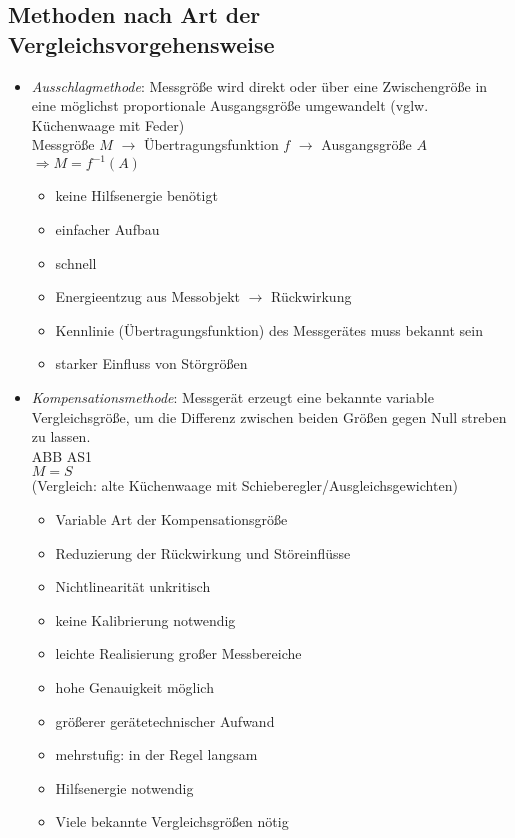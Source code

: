 \subsection{Methoden nach Art der Vergleichsvorgehensweise}
\begin{itemize}
\item \emph{Ausschlagmethode}: Messgröße wird direkt oder über eine Zwischengröße in eine möglichst proportionale Ausgangsgröße umgewandelt (vglw. Küchenwaage mit Feder)\\
Messgröße $M$ $\to$ Übertragungsfunktion $f$ $\to$ Ausgangsgröße $A$\\
$\Rightarrow \boxed{M = f^{-1}(A)}$
\begin{itemize}[label=$+$]
\item keine Hilfsenergie benötigt
\item einfacher Aufbau
\item schnell
\end{itemize}
\begin{itemize}[label=-]
\item Energieentzug aus Messobjekt $\to$ Rückwirkung
\item Kennlinie (Übertragungsfunktion) des Messgerätes muss bekannt sein
\item starker Einfluss von Störgrößen
\end{itemize}
\item \emph{Kompensationsmethode}: Messgerät erzeugt eine bekannte variable Vergleichsgröße, um die Differenz zwischen beiden Größen gegen Null streben zu lassen.\\
ABB AS1\\
$M=S$\\
(Vergleich: alte Küchenwaage mit Schieberegler/Ausgleichsgewichten)
\begin{itemize}[label=$+$]
\item Variable Art der Kompensationsgröße
\item Reduzierung der Rückwirkung und Störeinflüsse
\item Nichtlinearität unkritisch
\item keine Kalibrierung notwendig
\item leichte Realisierung großer Messbereiche
\item hohe Genauigkeit möglich
\end{itemize}
\begin{itemize}[label=-]
\item größerer gerätetechnischer Aufwand
\item mehrstufig: in der Regel langsam
\item Hilfsenergie notwendig
\item Viele bekannte Vergleichsgrößen nötig
\end{itemize}
\end{itemize}
